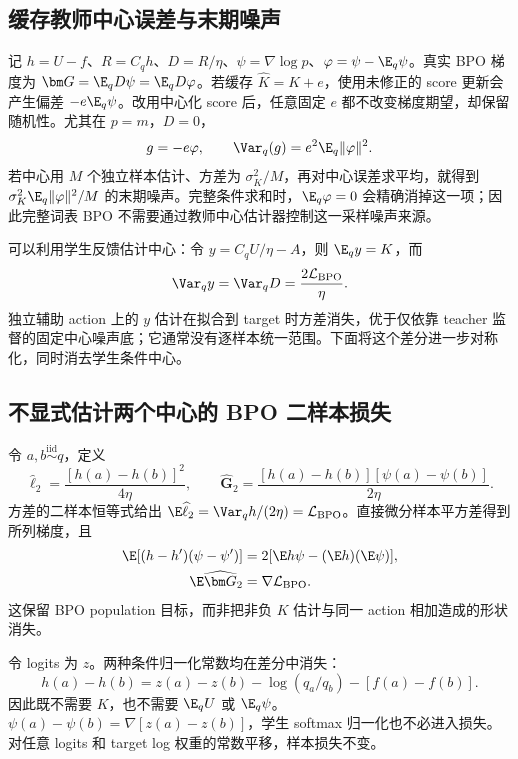 \subsection{缓存教师中心误差与末期噪声}

记 $h=U-f$、$R=C_qh$、$D=R/\eta$、$\psi=\nabla\log p$、$\varphi=\psi-\E_q\psi$。真实 BPO 梯度为 $\bm G=\E_qD\psi=\E_qD\varphi$。若缓存 $\widehat K=K+e$，使用未修正的 score 更新会产生偏差 $-e\E_q\psi$。改用中心化 score 后，任意固定 $e$ 都不改变梯度期望，却保留随机性。尤其在 $p=m$，$D=0$，
\begin{equation}
 g=-e\varphi,\qquad
 \Var_q(g)=e^2\E_q\|\varphi\|^2.
\end{equation}
若中心用 $M$ 个独立样本估计、方差为 $\sigma_K^2/M$，再对中心误差求平均，就得到 $\sigma_K^2\E_q\|\varphi\|^2/M$ 的末期噪声。完整条件求和时，$\E_q\varphi=0$ 会精确消掉这一项；因此完整词表 BPO 不需要通过教师中心估计器控制这一采样噪声来源。

可以利用学生反馈估计中心：令 $y=C_qU/\eta-A$，则 $\E_qy=K$，而
\begin{equation}
 \Var_qy=\Var_qD=\frac{2\mathcal L_{\mathrm{BPO}}}{\eta}.
\end{equation}
独立辅助 action 上的 $y$ 估计在拟合到 target 时方差消失，优于仅依靠 teacher 监督的固定中心噪声底；它通常没有逐样本统一范围。下面将这个差分进一步对称化，同时消去学生条件中心。
\subsection{不显式估计两个中心的 BPO 二样本损失}

令 $a,b\overset{\mathrm{iid}}\sim q$，定义
\begin{equation}
 \widehat\ell_2=\frac{[h(a)-h(b)]^2}{4\eta},\qquad
 \widehat{\bm G}_2=\frac{[h(a)-h(b)][\psi(a)-\psi(b)]}{2\eta}.
 \label{eq:center-free-pair-bpo}
\end{equation}
方差的二样本恒等式给出 $\E\widehat\ell_2=\Var_qh/(2\eta)=\mathcal L_{\mathrm{BPO}}$。直接微分样本平方差得到所列梯度，且
\begin{align}
 \E[(h-h')(\psi-\psi')]&=2[\E h\psi-(\E h)(\E\psi)],\\
 \E\widehat{\bm G}_2&=\nabla\mathcal L_{\mathrm{BPO}}.
\end{align}
这保留 BPO population 目标，而非把非负 $K$ 估计与同一 action 相加造成的形状消失。

令 logits 为 $z$。两种条件归一化常数均在差分中消失：
\begin{equation}
 h(a)-h(b)=z(a)-z(b)-\log(q_a/q_b)-[f(a)-f(b)].
\end{equation}
因此既不需要 $K$，也不需要 $\E_qU$ 或 $\E_q\psi$。$\psi(a)-\psi(b)=\nabla[z(a)-z(b)]$，学生 softmax 归一化也不必进入损失。对任意 logits 和 target log 权重的常数平移，样本损失不变。

